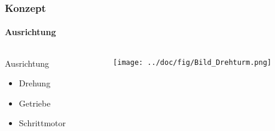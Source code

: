 \begin{frame}
    \frametitle{Konzept}
    \framesubtitle{Ausrichtung}
    \begin{columns}
        \begin{column}{0.4\textwidth}
            \begin{block}{Ausrichtung}
                \begin{itemize}
                    \item Drehung
                    \item Getriebe
                    \item Schrittmotor
                \end{itemize}
            \end{block}
        \end{column}
        \begin{column}{0.6\textwidth}
            \centering
            \texttt{[image: ../doc/fig/Bild\_Drehturm.png]}
        \end{column}
    \end{columns}
\end{frame}

